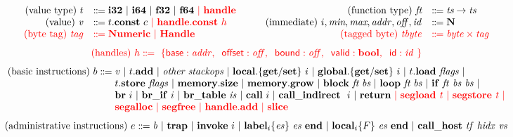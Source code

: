\documentclass{standalone}
\begin{document}
\footnotesize

\[
  \begin{array}{rl}
    \text{(value type)} ~ t &\dotdoteq \xxWithirtytwo~|~\xxWisixtyfour~|~\xxWfthirtytwo~|~\xxWfsixtyfour~\rr{|~\xxWhandle}\\
    \text{(value)} ~\V{v} &\dotdoteq t.\xxWconst~c~\rr{|~\xxWhandle.\xxWconst~h}\\
    \rr{\text{(byte tag)}~\V{tag}} & \rr{\dotdoteq \xxWNumeric ~|~\xxWHandle}
  \end{array}\qquad
  \begin{array}{rl}
    \text{(function type)} ~ \textit{ft} &\dotdoteq \textit{ts} \to \textit{ts}\\
    \text{(immediate)} ~ i,\textit{min},\textit{max},\V{addr},\V{off}, \V{id} &\dotdoteq \xxCN\\
    \rr{\text{(tagged byte)}~\V{tbyte}} & \rr{\dotdoteq \V{byte}\times\V{tag}} 
  \end{array}
  \]
  \[ \rr{\text{(handles)}~h\dotdoteq~\{ \xxWbase:\V{addr},\;\; \xxWoffset:\V{off},\;\; \xxWbound:\V{off},\;\; \xxWvalid:\xxCbool,\;\; \xxWid:\V{id}~\}} \]
\[
  \begin{array}{@{}l@{}}
    \text{(basic instructions)}~b \dotdoteq
    \begin{array}[t]{@{}l@{}}
      \V{v}~|~t.\KK{add}~|~\textit{other stackops}~|~
      \KK{local.\{get/set\}}~i~|~\KK{global.\{get/set\}}~i~|~
      t.\KK{load}~\V{flags}~|~
      \\
      t.\KK{store}~\V{flags}~|~\KK{memory.size}~|~ \KK{memory.grow}~|~
      \KK{block}~\textit{ft}~\textit{bs} ~|~ \KK{loop}~\textit{ft}~\V{bs}~|~\KK{if}~\V{ft}~\V{bs}~\V{bs}~|~
      \\
      \KK{br}~i~|~\KK{br\_if}~i~|~\KK{br\_table}~\V{is}~|~ \xxWcall~i~|~\xxWcallindirect~i~|~\KK{return}~\rr{|~\xxWsegload~\V{t}~|~\xxWsegstore~\V{t}~|}
      \\
      \rr{\xxWsegalloc~|~\xxWsegfree~|~\xxWhandleadd~|~\xxWslice}
    \end{array}
  \end{array}
  \]
  \[
  \begin{array}{@{}l@{}}
    \text{(administrative instructions)}~e \dotdoteq
    \begin{array}[t]{@{}l@{}}
      \V{b}~|~\KK{trap}~|~\xxWinvoke~i~|~\xxWlabel{i}{\V{es}}{\V{es}}~|~
      \xxWlocal{i}{F}{\V{es}}~|~\xxWcallhost~\V{tf}~\V{hidx}~\V{vs}
    \end{array}
  \end{array}
\]
\end{document}
